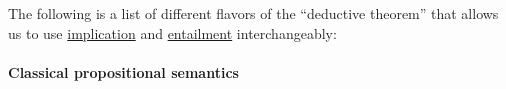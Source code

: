\begin{remark}\label{rem:deduction_theorem_list}
  The following is a list of different flavors of the \enquote{deductive theorem} that allows us to use \hyperref[def:propositional_alphabet/connectives/conditional]{implication} and \hyperref[def:entailment_system/entailment]{entailment} interchangeably:
  \begin{thmenum}
     
     
     
  \end{thmenum}
\end{remark}

\paragraph{Classical propositional semantics}

